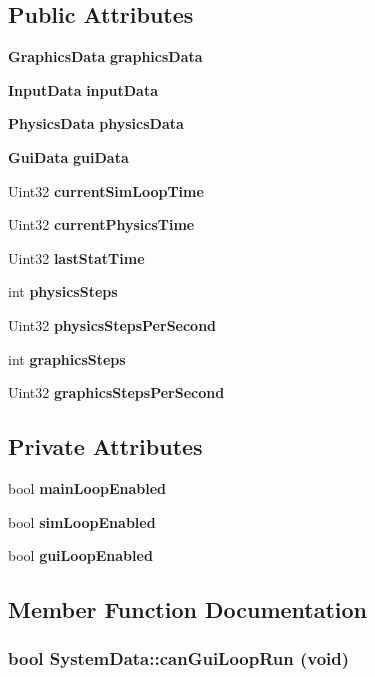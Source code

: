 \subsection*{Public Attributes}
\begin{CompactItemize}
\item 
{\bf Graphics\-Data} {\bf graphics\-Data}
\item 
{\bf Input\-Data} {\bf input\-Data}
\item 
{\bf Physics\-Data} {\bf physics\-Data}
\item 
{\bf Gui\-Data} {\bf gui\-Data}
\item 
Uint32 {\bf current\-Sim\-Loop\-Time}
\item 
Uint32 {\bf current\-Physics\-Time}
\item 
Uint32 {\bf last\-Stat\-Time}
\item 
int {\bf physics\-Steps}
\item 
Uint32 {\bf physics\-Steps\-Per\-Second}
\item 
int {\bf graphics\-Steps}
\item 
Uint32 {\bf graphics\-Steps\-Per\-Second}
\end{CompactItemize}
\subsection*{Private Attributes}
\begin{CompactItemize}
\item 
bool {\bf main\-Loop\-Enabled}
\item 
bool {\bf sim\-Loop\-Enabled}
\item 
bool {\bf gui\-Loop\-Enabled}
\end{CompactItemize}


\subsection{Member Function Documentation}
\subsubsection{\setlength{\rightskip}{0pt plus 5cm}bool System\-Data::can\-Gui\-Loop\-Run (void)}\label{classSystemData_a2}


